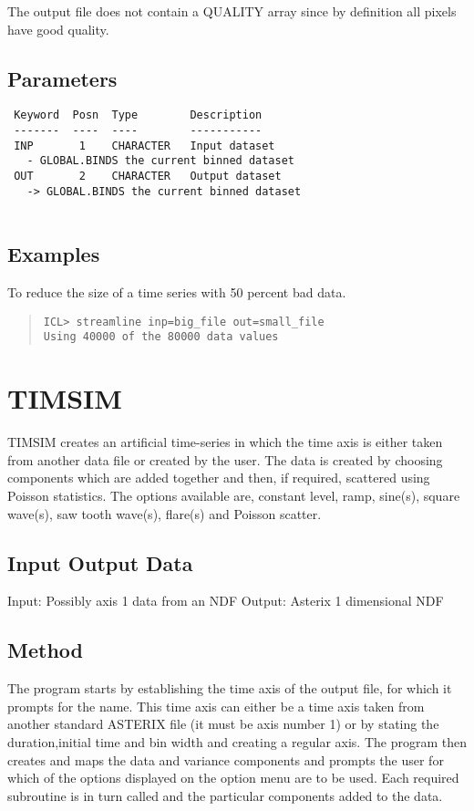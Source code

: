 \documentclass{book}
\renewcommand{\_}{{\tt\char'137}}     %
\begin{document}
The output file does not contain a QUALITY array since by definition
all pixels have good quality.
 
\subsection{Parameters}
\begin{verbatim}
 Keyword  Posn  Type        Description
 -------  ----  ----        -----------
 INP       1    CHARACTER   Input dataset
   - GLOBAL.BINDS the current binned dataset
 OUT       2    CHARACTER   Output dataset
   -> GLOBAL.BINDS the current binned dataset
 
\end{verbatim}\subsection{Examples}
To reduce the size of a time series with 50 percent bad data.
\begin{quote}\begin{verbatim}
ICL> streamline inp=big_file out=small_file
Using 40000 of the 80000 data values
\end{verbatim}\end{quote}
\section{TIMSIM}
TIMSIM creates an artificial time-series in which the time axis is
either taken from another data file or created by the user. The data
is created by choosing components which are added together and then,
if required, scattered using Poisson statistics. The options available
are, constant level, ramp, sine(s), square wave(s), saw tooth wave(s),
flare(s) and Poisson scatter.
\subsection{Input Output Data}
Input: Possibly axis 1 data from an NDF
Output: Asterix 1 dimensional NDF
\subsection{Method}
The program starts by establishing the time axis of the output
file, for which it prompts for the name. This time axis can
either be a time axis taken from another standard ASTERIX file
(it must be axis number 1) or by stating the duration,initial
time and bin width and creating a regular axis. The program
then creates and maps the data and variance components and
prompts the user for which of the options displayed on the
option menu are to be used. Each required subroutine is in
turn called and the particular components added to the data.
\end{document}
